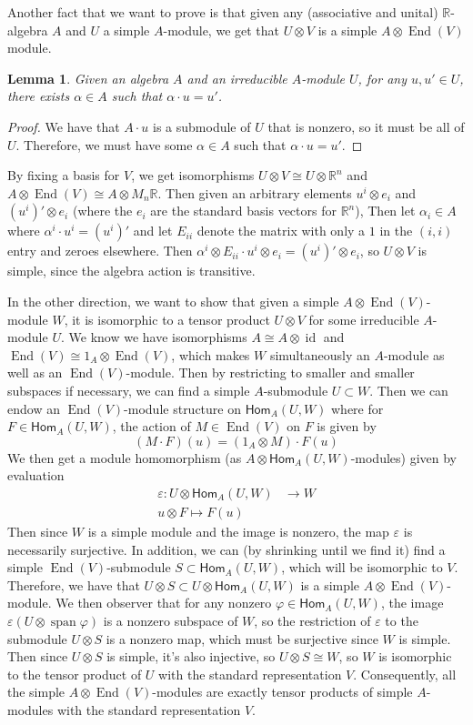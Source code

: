 \documentclass[psamsfonts]{amsart}
\newtheorem*{lem*}{Lemma}
\theoremstyle{definition}
\theoremstyle{remark}
\renewcommand{\hom}{\mathsf{Hom}}
\newcommand{\R}{\mathbb{R}}
\DeclareMathOperator{\id}{id}
\DeclareMathOperator{\End}{End}
\DeclareMathOperator{\spn}{span}
\begin{document}
Another fact that we want to prove is that given any (associative and unital) $\R$-algebra $A$ and $U$ a simple $A$-module, we get that $U \otimes V$ is a simple $A \otimes \End(V)$ module. 
%
\begin{lem*}
Given an algebra $A$ and an irreducible $A$-module $U$, for any $u,u' \in U$, there exists $\alpha \in A$ such that $\alpha \cdot u = u'$.
\end{lem*}
%
\begin{proof}
We have that $A \cdot u$ is a submodule of $U$ that is nonzero, so it must be all of $U$. Therefore, we must have some $\alpha \in A$ such that $\alpha \cdot u = u'$.
\end{proof}
By fixing a basis for $V$, we get isomorphisms $U \otimes V \cong U \otimes \R^n$ and $A \otimes \End(V) \cong A \otimes M_n\R$. Then given an arbitrary elements $u^i \otimes e_i$ and $(u^i)' \otimes e_i$ (where the $e_i$ are the standard basis vectors for $\R^n$), Then let $\alpha_i \in A$ where $\alpha^i \cdot u^i = (u^i)'$ and let $E_{ii}$ denote the matrix with only a $1$ in the $(i,i)$ entry and zeroes elsewhere. Then $\alpha^i \otimes E_{ii} \cdot u^i \otimes e_i = (u^i)' \otimes e_i$, so $U \otimes V$ is simple, since the algebra action is transitive.

In the other direction, we want to show that given a simple $A \otimes \End(V)$-module $W$, it is isomorphic to a tensor product $U \otimes V$ for some irreducible $A$-module $U$. We know we have isomorphisms $A \cong A \otimes \id$ and $\End(V) \cong 1_A \otimes \End(V)$, which makes $W$ simultaneously an $A$-module as well as an $\End(V)$-module. Then by restricting to smaller and smaller subspaces if necessary, we can find a simple $A$-submodule $U \subset W$. Then we can endow an $\End(V)$-module structure on $\hom_A(U,W)$ where for $F \in \hom_A(U,W)$, the action of $M \in \End(V)$ on $F$ is given by
$$ (M \cdot F)(u) = (1_A \otimes M) \cdot F(u) $$
We then get a module homomorphism (as $A \otimes \hom_A(U, W)$-modules) given by evaluation
\begin{align*}
\varepsilon : U \otimes \hom_A(U,W) &\to W \\
u \otimes F \mapsto F(u)
\end{align*}
Then since $W$ is a simple module and the image is nonzero, the map $\varepsilon$ is necessarily surjective. In addition, we can (by shrinking until we find it) find a simple $\End(V)$-submodule $S \subset \hom_A(U,W)$, which will be isomorphic to $V$. Therefore, we have that $U \otimes S \subset U \otimes \hom_A(U,W)$ is a simple $A \otimes \End(V)$-module. We then observer that for any nonzero $\varphi \in \hom_A(U,W)$, the image $\varepsilon (U \otimes \spn{\varphi})$ is a nonzero subspace of $W$, so the restriction of $\varepsilon$ to the submodule $U \otimes S$ is a nonzero map, which must be surjective since $W$ is simple. Then since $U \otimes S$ is simple, it's also injective, so $U \otimes S \cong W$, so $W$ is isomorphic to the tensor product of $U$ with the standard representation $V$. Consequently, all the simple $A \otimes \End(V)$-modules are exactly tensor products of simple $A$-modules with the standard representation $V$.
\end{document}
